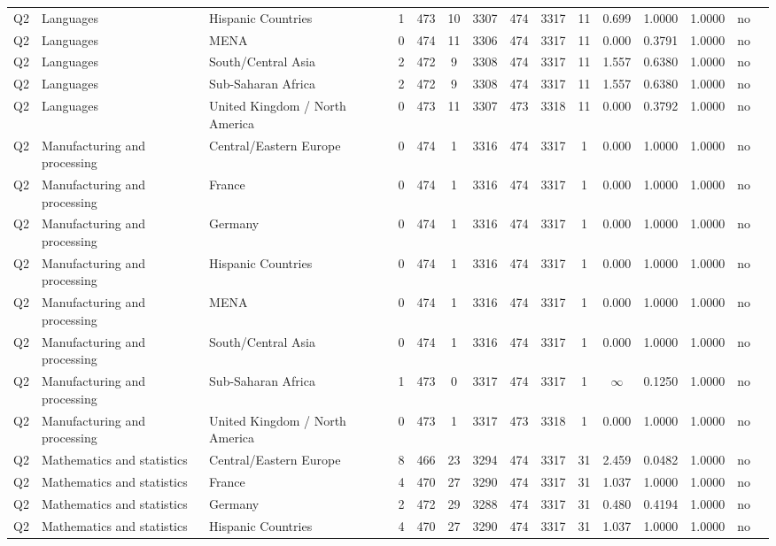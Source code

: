 \begin{longtable}{lllrcccccccccll}
Q2 & Languages & Hispanic Countries & 1 & 473 & 10 & 3307 & 474 & 3317 & 11 & 0.699 & 1.0000 & 1.0000 & no \\
Q2 & Languages & MENA & 0 & 474 & 11 & 3306 & 474 & 3317 & 11 & 0.000 & 0.3791 & 1.0000 & no \\
Q2 & Languages & South/Central Asia & 2 & 472 & 9 & 3308 & 474 & 3317 & 11 & 1.557 & 0.6380 & 1.0000 & no \\
Q2 & Languages & Sub-Saharan Africa & 2 & 472 & 9 & 3308 & 474 & 3317 & 11 & 1.557 & 0.6380 & 1.0000 & no \\
Q2 & Languages & United Kingdom / North America & 0 & 473 & 11 & 3307 & 473 & 3318 & 11 & 0.000 & 0.3792 & 1.0000 & no \\
Q2 & Manufacturing and processing & Central/Eastern Europe & 0 & 474 & 1 & 3316 & 474 & 3317 & 1 & 0.000 & 1.0000 & 1.0000 & no \\
Q2 & Manufacturing and processing & France & 0 & 474 & 1 & 3316 & 474 & 3317 & 1 & 0.000 & 1.0000 & 1.0000 & no \\
Q2 & Manufacturing and processing & Germany & 0 & 474 & 1 & 3316 & 474 & 3317 & 1 & 0.000 & 1.0000 & 1.0000 & no \\
Q2 & Manufacturing and processing & Hispanic Countries & 0 & 474 & 1 & 3316 & 474 & 3317 & 1 & 0.000 & 1.0000 & 1.0000 & no \\
Q2 & Manufacturing and processing & MENA & 0 & 474 & 1 & 3316 & 474 & 3317 & 1 & 0.000 & 1.0000 & 1.0000 & no \\
Q2 & Manufacturing and processing & South/Central Asia & 0 & 474 & 1 & 3316 & 474 & 3317 & 1 & 0.000 & 1.0000 & 1.0000 & no \\
Q2 & Manufacturing and processing & Sub-Saharan Africa & 1 & 473 & 0 & 3317 & 474 & 3317 & 1 & $\infty$ & 0.1250 & 1.0000 & no \\
Q2 & Manufacturing and processing & United Kingdom / North America & 0 & 473 & 1 & 3317 & 473 & 3318 & 1 & 0.000 & 1.0000 & 1.0000 & no \\
Q2 & Mathematics and statistics & Central/Eastern Europe & 8 & 466 & 23 & 3294 & 474 & 3317 & 31 & 2.459 & 0.0482 & 1.0000 & no \\
Q2 & Mathematics and statistics & France & 4 & 470 & 27 & 3290 & 474 & 3317 & 31 & 1.037 & 1.0000 & 1.0000 & no \\
Q2 & Mathematics and statistics & Germany & 2 & 472 & 29 & 3288 & 474 & 3317 & 31 & 0.480 & 0.4194 & 1.0000 & no \\
Q2 & Mathematics and statistics & Hispanic Countries & 4 & 470 & 27 & 3290 & 474 & 3317 & 31 & 1.037 & 1.0000 & 1.0000 & no \\

\end{longtable}
